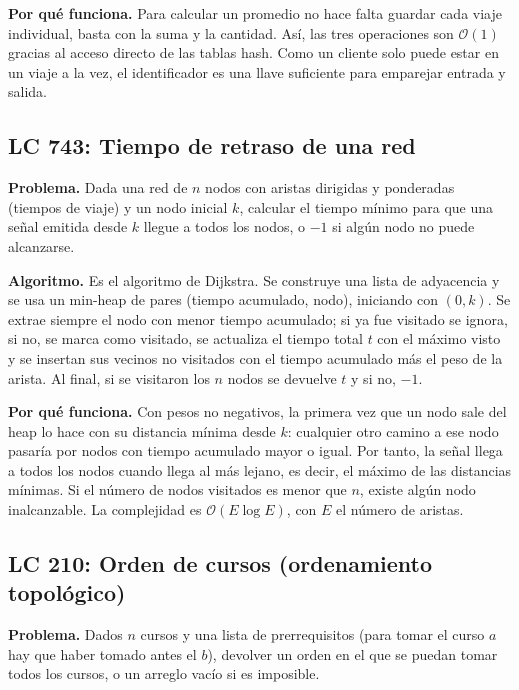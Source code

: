\documentclass[11pt,letterpaper]{article}
\newcommand{\bigO}[1]{\ensuremath{\mathcal{O}(#1)}}
\begin{document}
\textbf{Por qué funciona.} Para calcular un promedio no hace falta guardar cada viaje individual, basta con la suma y la cantidad. Así, las tres operaciones son \bigO{1} gracias al acceso directo de las tablas hash. Como un cliente solo puede estar en un viaje a la vez, el identificador es una llave suficiente para emparejar entrada y salida.

\subsection{LC 743: Tiempo de retraso de una red}

\textbf{Problema.} Dada una red de $n$ nodos con aristas dirigidas y ponderadas (tiempos de viaje) y un nodo inicial $k$, calcular el tiempo mínimo para que una señal emitida desde $k$ llegue a todos los nodos, o $-1$ si algún nodo no puede alcanzarse.

\textbf{Algoritmo.} Es el algoritmo de Dijkstra. Se construye una lista de adyacencia y se usa un min-heap de pares (tiempo acumulado, nodo), iniciando con $(0,k)$. Se extrae siempre el nodo con menor tiempo acumulado; si ya fue visitado se ignora, si no, se marca como visitado, se actualiza el tiempo total $t$ con el máximo visto y se insertan sus vecinos no visitados con el tiempo acumulado más el peso de la arista. Al final, si se visitaron los $n$ nodos se devuelve $t$ y si no, $-1$.

\textbf{Por qué funciona.} Con pesos no negativos, la primera vez que un nodo sale del heap lo hace con su distancia mínima desde $k$: cualquier otro camino a ese nodo pasaría por nodos con tiempo acumulado mayor o igual. Por tanto, la señal llega a todos los nodos cuando llega al más lejano, es decir, el máximo de las distancias mínimas. Si el número de nodos visitados es menor que $n$, existe algún nodo inalcanzable. La complejidad es \bigO{E \log E}, con $E$ el número de aristas.

\subsection{LC 210: Orden de cursos (ordenamiento topológico)}

\textbf{Problema.} Dados $n$ cursos y una lista de prerrequisitos (para tomar el curso $a$ hay que haber tomado antes el $b$), devolver un orden en el que se puedan tomar todos los cursos, o un arreglo vacío si es imposible.
\end{document}
